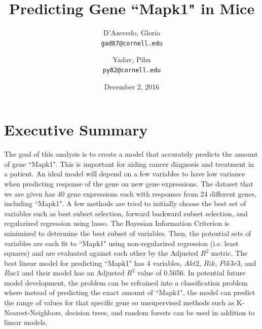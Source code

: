 \documentclass{article}
\title{Predicting Gene ``Mapk1" in Mice}
\author{
  D'Azevedo, Gloria\\
  \texttt{gad87@cornell.edu}
  \and
  Yadav, Pihu\\
  \texttt{py82@cornell.edu}
}
\date{December 2, 2016}
\begin{document}
\maketitle

\tableofcontents

\section{Executive Summary}
The goal of this analysis is to create a model that accurately predicts the amount of gene ``Mapk1".  This is important for aiding cancer diagnosis and treatment in a patient.  An ideal model will depend on a few variables to have low variance when predicting response of the gene on new gene expressions.  The dataset that we are given has 40 gene expressions each with responses from 24 different genes, including ``Mapk1".  A few methods are tried to initially choose the best set of variables such as best subset selection, forward backward subset selection, and regularized regression using lasso.  The Bayesian Information Criterion is minimized to determine the best subset of variables.  Then, the potential sets of variables are each fit to ``Mapk1" using non-regularized regression (i.e. least squares) and are evaluated against each other by the Adjusted $R^2$ metric.  The best linear model for predicting ``Mapk1" has 4 variables, $Akt2$, $Rik$, $Pik3r3$, and $Rac1$ and their model has an Adjusted $R^2$ value of 0.5656.  In potential future model development, the problem can be refrained into a classification problem where instead of predicting the exact amount of ``Mapk1", the model can predict the range of values for that specific gene so unsupervised methods such as K-Nearest-Neighbors, decision trees, and random forests can be used in addition to linear models.
\end{document}
